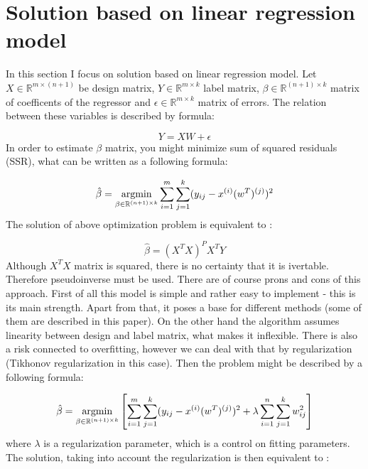 \section{Solution based on linear regression model}

In this section I focus on solution based on linear regression model. Let $X \in \mathbb{R}^{m \times  ( n+1 )}$ be design matrix, $Y \in \mathbb{R}^{m \times k}$ label matrix, $\beta \in \mathbb{R}^{(n+1) \times k}$ matrix of coefficents of the regressor and $\epsilon \in \mathbb{R}^{m \times k}$ matrix of errors. The relation between these variables is described by formula:

\begin{equation}\label{eq:LR1}
    Y = XW + \epsilon 
\end{equation}
In order to estimate $\beta$ matrix, you might minimize sum of squared residuals (SSR), what can be written as a following formula:

\begin{equation}\label{eq:LR2}
    \hat{\beta} = \operatorname*{argmin}_{\beta \in \mathbb{R}^{(n+1) \times k}}\sum\limits_{i=1}^{m}\sum\limits_{j=1}^{k}(y_{ij}-x^{(i)}(w^T)^{(j)})^2
\end{equation}
The solution of above optimization problem is equivalent to \cite{Weisberg}:

\begin{equation}\label{eq:LR3}
    \hat{\beta} = (X^TX)^{P}X^TY
\end{equation}
Although $X^TX$ matrix is squared, there is no certainty that it is ivertable. Therefore pseudoinverse must be used. There are of course prons and cons of this approach. First of all this model is simple and rather easy to implement - this is its main strength. Apart from that, it poses a base for different methods (some of them are described in this paper). On the other hand the algorithm assumes linearity between design and label matrix, what makes it inflexible.  
There is also a risk connected to overfitting, however we can deal with that by regularization (Tikhonov regularization in this case). Then the problem might be described by a following formula:

\begin{equation}\label{eq:LR2}
    \hat{\beta} = \operatorname*{argmin}_{\beta \in \mathbb{R}^{(n+1) \times k}}\left[\sum\limits_{i=1}^{m}\sum\limits_{j=1}^{k}(y_{ij}-x^{(i)}(w^T)^{(j)})^2 + \lambda\sum\limits_{i=1}^{n}\sum\limits_{j=1}^{k}w_{ij}^2\right]
\end{equation}
where $\lambda$ is a regularization parameter, which is a control on fitting parameters.
The solution, taking into account the regularization is then equivalent to \cite{Tikh}:

